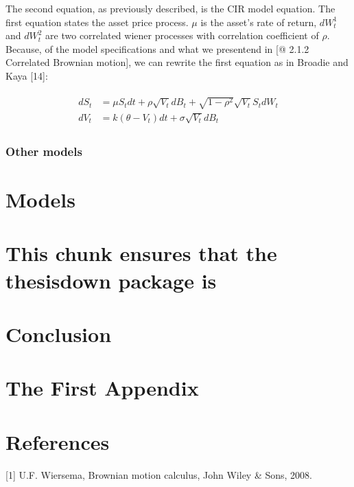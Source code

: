 \documentclass[12pt,twoside]{reedthesis}
\theoremstyle{definition}
\theoremstyle{definition}
\theoremstyle{remark}
\begin{document}
  The second equation, as previously described, is the CIR model equation.
  The first equation states the asset price process. \(\mu\) is the
  asset's rate of return, \(dW^1_t\) and \(dW^2_t\) are two correlated
  wiener processes with correlation coefficient of \(\rho\). Because, of
  the model specifications and what we presentend in {[}@ 2.1.2 Correlated
  Brownian motion{]}, we can rewrite the first equation as in Broadie and
  Kaya {[}14{]}:
  
  \begin{align}
  \label{eq:heston2}
  \begin{split}
  dS_t &= \mu S_t dt + \rho \sqrt{V_t} dB_t + \sqrt{1 - \rho^2} \sqrt{V_t} S_t dW_t \\
  dV_t &= k(\theta - V_t)dt + \sigma \sqrt{V_t} dB_t
  \end{split}
  \end{align}
  
  \subsection{Other models}\label{other-models}
  
  \chapter{Models}\label{models}
  
  \chapter{This chunk ensures that the thesisdown package
  is}\label{this-chunk-ensures-that-the-thesisdown-package-is}
  
  \chapter{Conclusion}\label{conclusion}
  
  \chapter{The First Appendix}\label{the-first-appendix}
  
  \chapter*{References}\label{references}
  
  \hypertarget{refs}{}
  \hypertarget{ref-ubbo}{}
  {[}1{]} U.F. Wiersema, Brownian motion calculus, John Wiley \& Sons,
  2008.
  
\end{document}
